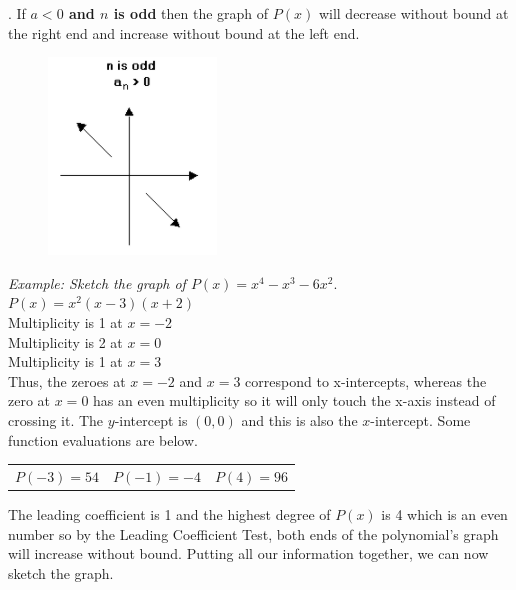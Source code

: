         . If \textbf{$a<0$ and $n$ is odd} then the graph of $P(x)$ will decrease without
        bound at the right end and increase without bound at the left end. \\
        \begin{figure} [hbt!]
            \centering
            \includegraphics[scale = 0.5] {Resources/Unit4HigherPolynomials/leadcoeff4.png}
        \end{figure}

        \noindent \color{blue} \textit{Example: Sketch the graph of $P(x)=x^4-x^3-6x^2$}. \color{black} \\
        $P(x)=x^2(x-3)(x+2)$ \\
        Multiplicity is 1 at $x=-2$ \\
        Multiplicity is 2 at $x=0$ \\
        Multiplicity is 1 at $x=3$ \\

        \noindent Thus, the zeroes at $x=-2$ and $x=3$ correspond to x-intercepts, whereas the
        zero at $x=0$ has an even multiplicity so it will only touch the x-axis instead of
        crossing it. The $y$-intercept is $(0,0)$ and this is also the $x$-intercept.
        Some function evaluations are below. \\
        \begin{center}
            \begin{tabular}{ccc}
                $P(-3)=54$ & $P(-1)=-4$ & $P(4)=96$
            \end{tabular}
        \end{center}

        \noindent The leading coefficient is 1 and the highest degree of $P(x)$ is 4 which is
        an even number so by the Leading Coefficient Test, both ends of the polynomial's graph
        will increase without bound. Putting all our information together, we can now sketch
        the graph. \\

